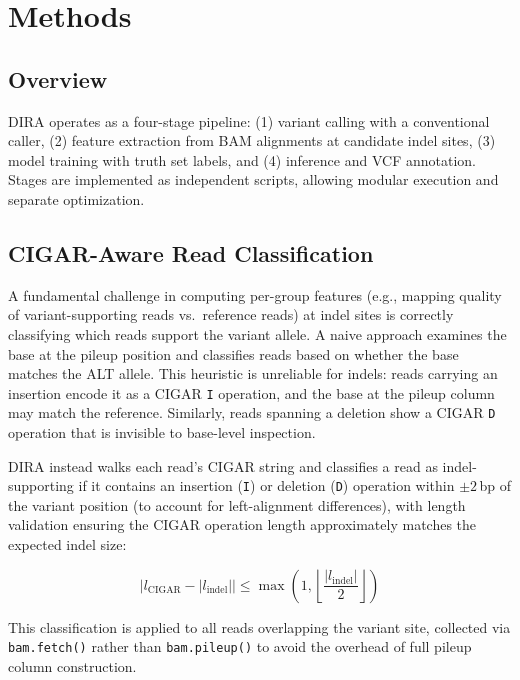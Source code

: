 \documentclass[sigconf]{acmart}
\begin{document}
\section{Methods}

\subsection{Overview}
DIRA operates as a four-stage pipeline: (1) variant calling with a conventional caller, (2) feature extraction from BAM alignments at candidate indel sites, (3) model training with truth set labels, and (4) inference and VCF annotation. Stages are implemented as independent scripts, allowing modular execution and separate optimization.

\subsection{CIGAR-Aware Read Classification}
\label{sec:cigar}
A fundamental challenge in computing per-group features (e.g., mapping quality of variant-supporting reads vs.\ reference reads) at indel sites is correctly classifying which reads support the variant allele. A naive approach examines the base at the pileup position and classifies reads based on whether the base matches the ALT allele. This heuristic is unreliable for indels: reads carrying an insertion encode it as a CIGAR \texttt{I} operation, and the base at the pileup column may match the reference. Similarly, reads spanning a deletion show a CIGAR \texttt{D} operation that is invisible to base-level inspection.

DIRA instead walks each read's CIGAR string and classifies a read as indel-supporting if it contains an insertion (\texttt{I}) or deletion (\texttt{D}) operation within $\pm 2$\,bp of the variant position (to account for left-alignment differences), with length validation ensuring the CIGAR operation length approximately matches the expected indel size:

\begin{equation}
|l_{\text{CIGAR}} - |l_{\text{indel}}|| \leq \max\left(1, \left\lfloor\frac{|l_{\text{indel}}|}{2}\right\rfloor\right)
\end{equation}

This classification is applied to all reads overlapping the variant site, collected via \texttt{bam.fetch()} rather than \texttt{bam.pileup()} to avoid the overhead of full pileup column construction.
\end{document}
